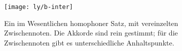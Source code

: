 \begin{figure}
  \centering
  \texttt{[image: ly/b-inter]}
  \caption{Ein im Wesentlichen homophoner Satz, mit vereinzelten
    Zwischennoten. Die Akkorde sind rein gestimmt; für die Zwischennoten gibt
    es unterschiedliche Anhaltspunkte.}\label{fig:inter}
\end{figure}

